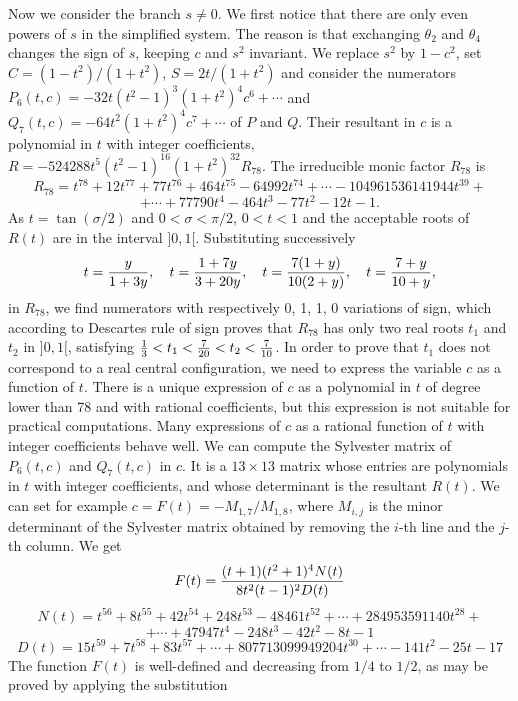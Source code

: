 \documentclass[11pt]{article}
\begin{document}
Now we consider the branch $s\neq 0$. We
first notice that there are only even powers of $s$ in the
simplified system. The reason is that exchanging $\theta_2$ and
$\theta_4$ changes the sign of $s$, keeping $c$ and $s^2$ invariant.
We replace $s^2$ by $1-c^2$, set $C=(1-t^2)/(1+t^2)$, $S=2t/(1+t^2)$
and consider the numerators
$P_6(t,c)=-32t(t^2-1)^3(1+t^2)^4c^6+\cdots$ and
$Q_7(t,c)=-64t^2(1+t^2)^4c^7+\cdots$ of $P$ and $Q$. Their resultant
in $c$ is a polynomial in $t$ with integer coefficients,
$R=-524288t^5(t^2-1)^{16}(1+t^2)^{32}R_{78}$. The irreducible monic
factor $R_{78}$ is
$$R_{78}=t^{78}+12t^{77}+77t^{76}+464t^{75}-64992t^{74}+\cdots-104961536141944t^{39}+$$
$$+\cdots+77790t^4-464t^3-77t^2-12t-1.$$
As $t=\tan(\sigma/2)$ and  $0<\sigma<\pi/2$, $0<t<1$ and the acceptable roots of $R(t)$ are in the interval $]0,1[$. Substituting successively
$$t={y\over 1+3y},\quad t={1+7y\over 3+20y},\quad t={7(1+y)\over 10(2+y)},\quad t={7+y\over 10+y},$$
in $R_{78}$, we find numerators with respectively 0, 1, 1, 0 variations
of sign, which according to Descartes rule of sign proves that
$R_{78}$ has only two real roots $t_1$ and $t_2$ in $]0,1[$,
satisfying ${1\over 3}<t_1<{7\over 20}<t_2<{7\over 10}$. In order to
prove that $t_1$ does not correspond to a real central
configuration, we need to express the variable $c$ as a function of
$t$. There is a unique expression of $c$ as a polynomial in $t$ of
degree lower than 78 and with rational coefficients, but this
expression is not suitable for practical computations. Many
expressions of $c$ as a rational function of $t$ with integer
coefficients behave well. We can compute the Sylvester matrix of $P_6(t,c)$ and $Q_7(t,c)$ in $c$.
It is a $13\times13$ matrix whose entries are polynomials in $t$
with integer coefficients, and whose determinant is the resultant $R(t)$. We can set for example
$c=F(t)=-M_{1,7}/M_{1,8}$, where $M_{i,j}$ is the minor determinant
of the Sylvester matrix obtained by removing the $i$-th line and the
$j$-th column. We get
$$F(t)={(t+1)(t^2+1)^4N(t)\over 8t^2(t-1)^2D(t)}$$
$$ N(t)=t^{56}+8t^{55}+42t^{54}+248t^{53}-48461t^{52}+\cdots+284953591140
t^{28}+$$
$$+\cdots+47947t^4-248t^3-42t^2-8t-1 $$
$$
D(t)=15t^{59}+7t^{58}+83t^{57}+\cdots+807713099949204
t^{30}+\cdots-141t^2-25t-17
$$
The function $F(t)$ is well-defined and decreasing
from $1/4$ to $1/2$, as may be proved by applying the substitution
\end{document}
